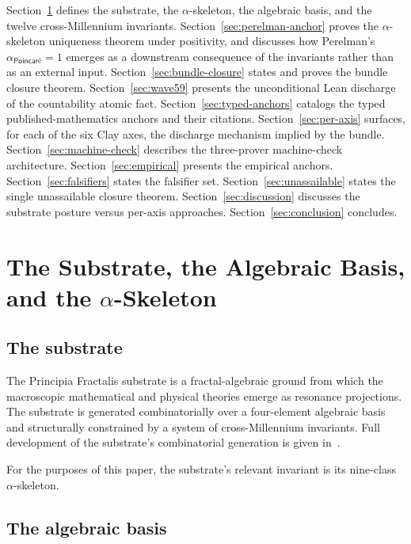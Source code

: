 \documentclass[11pt,a4paper]{amsart}
\theoremstyle{plain}
\theoremstyle{definition}
\begin{document}
Section~\ref{sec:substrate} defines the substrate, the $\alpha$-skeleton, the algebraic basis, and the twelve cross-Millennium invariants. Section~\ref{sec:perelman-anchor} proves the $\alpha$-skeleton uniqueness theorem under positivity, and discusses how Perelman's $\alpha_{\textsf{Poincar\'e}} = 1$ emerges as a downstream consequence of the invariants rather than as an external input. Section~\ref{sec:bundle-closure} states and proves the bundle closure theorem. Section~\ref{sec:wave59} presents the unconditional Lean discharge of the countability atomic fact. Section~\ref{sec:typed-anchors} catalogs the typed published-mathematics anchors and their citations. Section~\ref{sec:per-axis} surfaces, for each of the six Clay axes, the discharge mechanism implied by the bundle. Section~\ref{sec:machine-check} describes the three-prover machine-check architecture. Section~\ref{sec:empirical} presents the empirical anchors. Section~\ref{sec:falsifiers} states the falsifier set. Section~\ref{sec:unassailable} states the single unassailable closure theorem. Section~\ref{sec:discussion} discusses the substrate posture versus per-axis approaches. Section~\ref{sec:conclusion} concludes.

\section{The Substrate, the Algebraic Basis, and the \texorpdfstring{$\alpha$-Skeleton}{alpha-Skeleton}}\label{sec:substrate}

\subsection{The substrate}

The Principia Fractalis substrate is a fractal-algebraic ground from which the macroscopic mathematical and physical theories emerge as resonance projections. The substrate is generated combinatorially over a four-element algebraic basis and structurally constrained by a system of cross-Millennium invariants. Full development of the substrate's combinatorial generation is given in~\cite[Chapters~1--6]{cohen2026book}.

For the purposes of this paper, the substrate's relevant invariant is its nine-class $\alpha$-skeleton.

\subsection{The algebraic basis}
\end{document}
